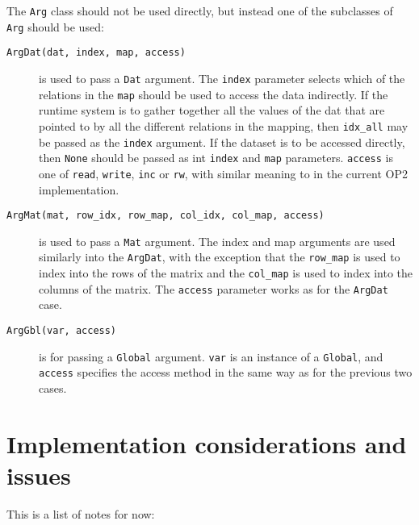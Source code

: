 \documentclass[a4paper]{article}
\begin{document}
The \verb|Arg| class should not be used directly, but instead one of the subclasses of \verb|Arg| should be used:

\begin{description}
  \item[\texttt{ArgDat(dat, index, map, access)}] is used to pass a \verb|Dat| argument. The \verb|index| parameter selects which of the relations in the \verb|map| should be used to access the data indirectly. If the runtime system is to gather together all the values of the dat that are pointed to by all the different relations in the mapping, then \verb|idx_all| may be passed as the \verb|index| argument. If the dataset is to be accessed directly, then \verb|None| should be passed as int \verb|index| and \verb|map| parameters. \verb|access| is one of \verb|read|, \verb|write|, \verb|inc| or \verb|rw|, with similar meaning to in the current OP2 implementation.
  \item[\texttt{ArgMat(mat, row\_idx, row\_map, col\_idx, col\_map, access)}] is used to pass a \verb|Mat| argument. The index and map arguments are used similarly into the \verb|ArgDat|, with the exception that the \verb|row_map| is used to index into the rows of the matrix and the \verb|col_map| is used to index into the columns of the matrix. The \verb|access| parameter works as for the \verb|ArgDat| case.
  \item[\texttt{ArgGbl(var, access)}] is for passing a \verb|Global| argument. \verb|var| is an instance of a \verb|Global|, and \verb|access| specifies the access method in the same way as for the previous two cases.
\end{description}

\section{Implementation considerations and issues}

This is a list of notes for now:
\end{document}
